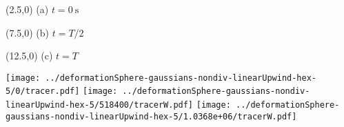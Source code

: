 \documentclass{article}
\begin{document}
\TPMargin{1pt}
\begin{textblock}{4}(2.5,0)
\normalsize
(a) $t=\SI{0}{\second}$
\end{textblock}
\begin{textblock}{4}(7.5,0)
\normalsize
(b) $t=T/2$
\end{textblock}
\begin{textblock}{4}(12.5,0)
\normalsize
(c) $t=T$
\end{textblock}
\vspace*{0.4em}
\texttt{[image: ../deformationSphere-gaussians-nondiv-linearUpwind-hex-5/0/tracer.pdf]}
\hspace*{0.2em}
\texttt{[image: ../deformationSphere-gaussians-nondiv-linearUpwind-hex-5/518400/tracerW.pdf]}
\hspace*{0.2em}
\texttt{[image: ../deformationSphere-gaussians-nondiv-linearUpwind-hex-5/1.0368e+06/tracerW.pdf]}
\end{document}
